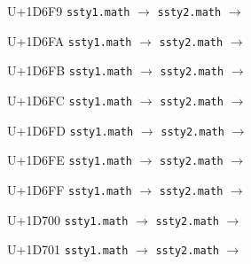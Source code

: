 \documentclass{article}
\begin{document}
\begin{substitutions}
\goodbreak

U+1D6F9  \linebreak
    \texttt{ssty1.math} $\to$  \linebreak
    \texttt{ssty2.math} $\to$  

\goodbreak

U+1D6FA  \linebreak
    \texttt{ssty1.math} $\to$  \linebreak
    \texttt{ssty2.math} $\to$  

\goodbreak

U+1D6FB  \linebreak
    \texttt{ssty1.math} $\to$  \linebreak
    \texttt{ssty2.math} $\to$  

\goodbreak

U+1D6FC  \linebreak
    \texttt{ssty1.math} $\to$  \linebreak
    \texttt{ssty2.math} $\to$  

\goodbreak

U+1D6FD  \linebreak
    \texttt{ssty1.math} $\to$  \linebreak
    \texttt{ssty2.math} $\to$  

\goodbreak

U+1D6FE  \linebreak
    \texttt{ssty1.math} $\to$  \linebreak
    \texttt{ssty2.math} $\to$  

\goodbreak

U+1D6FF  \linebreak
    \texttt{ssty1.math} $\to$  \linebreak
    \texttt{ssty2.math} $\to$  

\goodbreak

U+1D700  \linebreak
    \texttt{ssty1.math} $\to$  \linebreak
    \texttt{ssty2.math} $\to$  

\goodbreak

U+1D701  \linebreak
    \texttt{ssty1.math} $\to$  \linebreak
    \texttt{ssty2.math} $\to$  


\end{substitutions}
\end{document}
